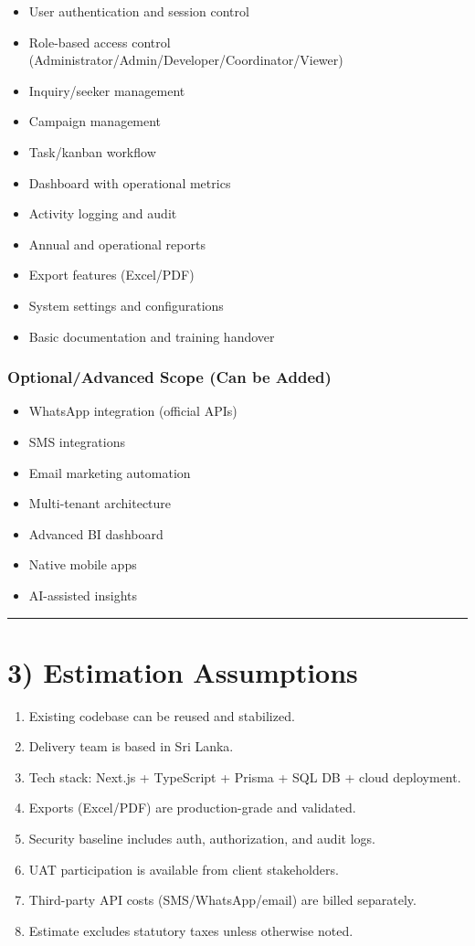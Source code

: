 \documentclass[11pt,a4paper]{article}
\begin{document}
\begin{itemize}
\item User authentication and session control
\item Role-based access control (Administrator/Admin/Developer/Coordinator/Viewer)
\item Inquiry/seeker management
\item Campaign management
\item Task/kanban workflow
\item Dashboard with operational metrics
\item Activity logging and audit
\item Annual and operational reports
\item Export features (Excel/PDF)
\item System settings and configurations
\item Basic documentation and training handover
\end{itemize}

\subsubsection{Optional/Advanced Scope (Can be Added)}

\begin{itemize}
\item WhatsApp integration (official APIs)
\item SMS integrations
\item Email marketing automation
\item Multi-tenant architecture
\item Advanced BI dashboard
\item Native mobile apps
\item AI-assisted insights
\end{itemize}

\bigskip\hrule\bigskip

\section{3) Estimation Assumptions}

\begin{enumerate}
\item Existing codebase can be reused and stabilized.
\item Delivery team is based in Sri Lanka.
\item Tech stack: Next.js + TypeScript + Prisma + SQL DB + cloud deployment.
\item Exports (Excel/PDF) are production-grade and validated.
\item Security baseline includes auth, authorization, and audit logs.
\item UAT participation is available from client stakeholders.
\item Third-party API costs (SMS/WhatsApp/email) are billed separately.
\item Estimate excludes statutory taxes unless otherwise noted.
\end{enumerate}
\end{document}
